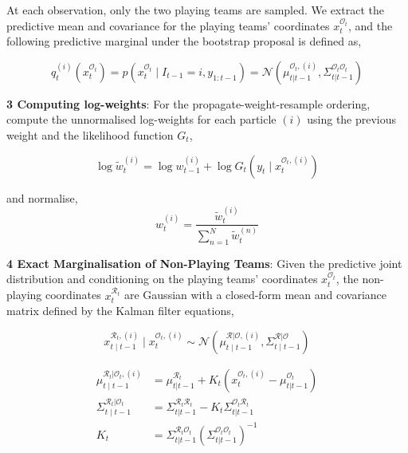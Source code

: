 At each observation, only the two playing teams are sampled. We extract the predictive mean and covariance for the playing teams' coordinates $x_t^{\mathcal{O}_t}$, and the following predictive marginal under the bootstrap proposal is defined as,

\begin{equation}
    q_t^{(i)}(x_t^{\mathcal{O}_t}) = p(x_t^{\mathcal{O}_t} \mid I_{t-1} = i, y_{1:t-1}) = \mathcal{N}(\mu_{t|t-1}^{\mathcal{O}_t,(i)}, \Sigma_{t|t-1}^{\mathcal{O}_t\mathcal{O}_t}) \nonumber
\end{equation}

\textbf{3 Computing log-weights}: For the propagate-weight-resample ordering, compute the unnormalised log-weights for each particle $(i)$ using the previous weight and the likelihood function $G_t$,

\begin{equation}
    \log \tilde{w}_t^{(i)} = \log w_{t-1}^{(i)} +  \log G_t(y_t \mid x_t^{\mathcal{O}_t, (i)}) \nonumber
\end{equation}

and normalise,
\begin{equation}
    w_t^{(i)} = \frac{\tilde{w}_t^{(i)}}{\sum_{n=1}^N \tilde{w}_t^{(n)}} \nonumber
\end{equation}

\textbf{4 Exact Marginalisation of Non-Playing Teams}: Given the predictive joint distribution and conditioning on the playing teams' coordinates $x_t^{\mathcal{O}_t}$, the non-playing coordinates $x_t^{\mathcal{R}_t}$ are Gaussian with a closed-form mean and covariance matrix defined by the Kalman filter equations,

\begin{equation}
    x^{\mathcal{R}_t,(i)}_{t \mid t-1} \mid x^{\mathcal{O}_t,(i)}_{t} \sim \mathcal{N}\left( \mu^{\mathcal{R}|\mathcal{O},(i)}_{t \mid t-1}, \Sigma^{\mathcal{R}|\mathcal{O}}_{t \mid t-1} \right) \nonumber
\end{equation}

\begin{align}
    \mu^{\mathcal{R}_t|\mathcal{O}_t,(i)}_{t \mid t-1} &= \mu_{t|t-1}^{\mathcal{R}_t} + K_t \left( x_t^{\mathcal{O}_t,(i)} - \mu_{t|t-1}^{\mathcal{O}_t} \right) \nonumber \\
    \Sigma^{\mathcal{R}_t|\mathcal{O}_t}_{t \mid t-1} &= \Sigma_{t|t-1}^{\mathcal{R}_t\mathcal{R}_t} - K_t \Sigma_{t|t-1}^{\mathcal{O}_t\mathcal{R}_t} \nonumber \\
    K_t &= \Sigma_{t|t-1}^{\mathcal{R}_t\mathcal{O}_t} \left( \Sigma_{t|t-1}^{\mathcal{O}_t\mathcal{O}_t} \right)^{-1} \nonumber
\end{align}

